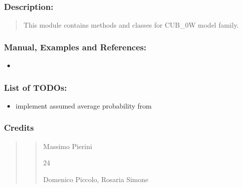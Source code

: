 \documentclass[letterpaper,10pt,english]{sphinxmanual}
\begin{document}
\subsubsection{Description:}
\label{\detokenize{cubmods:id1}}\begin{quote}

\sphinxAtStartPar
This module contains methods and classes
for CUB\_0W model family.
\end{quote}


\subsubsection{Manual, Examples and References:}
\label{\detokenize{cubmods:id2}}\begin{itemize}
\item {} 
\sphinxAtStartPar
{}

\end{itemize}


\subsubsection{List of TODOs:}
\label{\detokenize{cubmods:id3}}\begin{itemize}
\item {} 
\sphinxAtStartPar
implement assumed average probability from 

\end{itemize}


\subsubsection{Credits}
\label{\detokenize{cubmods:id4}}\begin{quote}
\begin{quote}\begin{description}
\sphinxAtStartPar
Massimo Pierini

\sphinxhyphen{}24

\sphinxAtStartPar
Domenico Piccolo, Rosaria Simone

\sphinxAtStartPar
{}

\end{description}\end{quote}
\end{quote}
\end{document}
